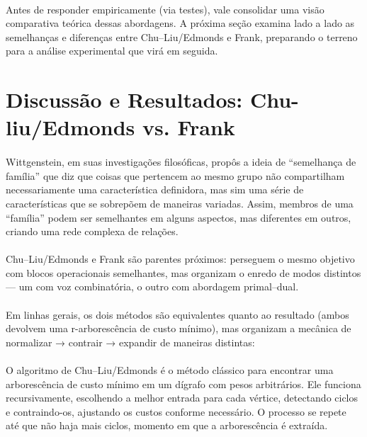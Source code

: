 \documentclass[12pt,a4paper]{article}
\def\emph#1{#1}%
\begin{document}
\paragraph{}
Antes de responder empiricamente (via testes), vale consolidar uma visão comparativa \emph{teórica} dessas abordagens. A próxima seção examina lado a lado as semelhanças e diferenças entre Chu–Liu/Edmonds e Frank, preparando o terreno para a análise experimental que virá em seguida.

\section{Discussão e Resultados: Chu-liu/Edmonds vs. Frank}

\paragraph{}
Wittgenstein, em suas investigações filosóficas, propôs a ideia de ``semelhança de família'' que diz que coisas que pertencem ao mesmo grupo não compartilham necessariamente uma característica definidora, mas sim uma série de características que se sobrepõem de maneiras variadas. Assim, membros de uma ``família'' podem ser semelhantes em alguns aspectos, mas diferentes em outros, criando uma rede complexa de relações.

\paragraph{}
Chu–Liu/Edmonds e Frank são parentes próximos: perseguem o mesmo objetivo com blocos operacionais semelhantes, mas organizam o enredo de modos distintos — um com voz combinatória, o outro com abordagem primal–dual.

\paragraph{}
Em linhas gerais, os dois métodos são equivalentes quanto ao resultado (ambos devolvem uma r-arborescência de custo mínimo), mas organizam a mecânica de normalizar → contrair → expandir de maneiras distintas:

\paragraph{}
O algoritmo de Chu–Liu/Edmonds \cite{chu1965,edmonds1967optimum} é o método clássico para encontrar uma arborescência de custo mínimo em um dígrafo com pesos arbitrários. Ele funciona recursivamente, escolhendo a melhor entrada para cada vértice, detectando ciclos e contraindo-os, ajustando os custos conforme necessário. O processo se repete até que não haja mais ciclos, momento em que a arborescência é extraída.
\end{document}
